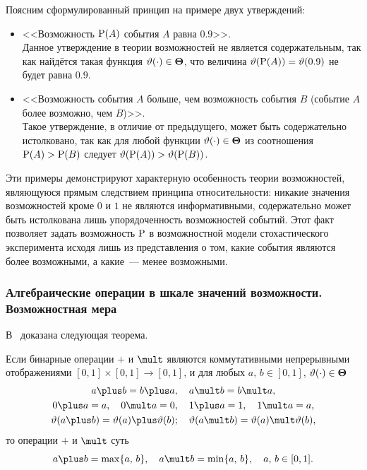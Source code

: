 Поясним сформулированный принцип на примере двух утверждений:
\begin{itemize}
\item
    <<Возможность $\P(A)$ события $A$ равна $0.9$>>.\\
    Данное утверждение в теории возможностей не является содержательным, так как найдётся такая функция $\vtheta(\cdot)\in\bTheta$, что величина $\vtheta(\P(A))=\vtheta(0.9)$ не будет равна $0.9$.

\item
    <<Возможность события $A$ больше, чем возможность события $B$ (событие $A$ более возможно, чем $B$)>>.\\
    Такое утверждение, в отличие от предыдущего, может быть содержательно истолковано, так как для любой функции $\vtheta(\cdot)\in\bTheta$ из соотношения $\P(A)>\P(B)$ следует $\vtheta(\P(A))>\vtheta(\P(B))$.
\end{itemize}

Эти примеры демонстрируют характерную особенность теории возможностей, являющуюся прямым следствием принципа относительности: никакие значения возможностей кроме $0$ и $1$ не являются информативными, содержательно может быть истолкована лишь упорядоченность возможностей событий. Этот факт позволяет задать возможность $\P$ в возможностной модели стохастического эксперимента исходя лишь из представления о том, какие события являются более возможными, а какие~--- менее возможными.

\subsubsection{Алгебраические операции в шкале значений возможности. Возможностная мера}
\label{sec:sec_20151029_03}

В~\cite{possbook, possbook2} доказана следующая теорема.
\begin{theorem}
\label{th:plus_mult_operations}
Если бинарные операции $\plus$ и $\mult$ являются коммутативными непрерывными отображениями $[0,1]\times[0,1]\to[0,1]$, и для любых $a,\, b\in[0,1]$, $\vtheta(\cdot)\in\bTheta$
\begin{gather*}
    a\plus b = b\plus a, \quad a\mult b = b\mult a,\\
    0\plus a = a, \quad 0\mult a = 0, \quad 1\plus a = 1, \quad 1\mult a = a,\\
    \vtheta(a\plus b) = \vtheta(a) \plus \vtheta(b); \quad \vtheta(a\mult b) = \vtheta(a) \mult \vtheta(b),
\end{gather*}
то операции $\plus$ и $\mult$ суть
\begin{equation}
\label{20151029_01}
    a \plus b = \max\{a,\, b\}, \quad a \mult b = \min\{a,\, b\}, \quad a,\,b \in [0,1].
\end{equation}
\end{theorem}

